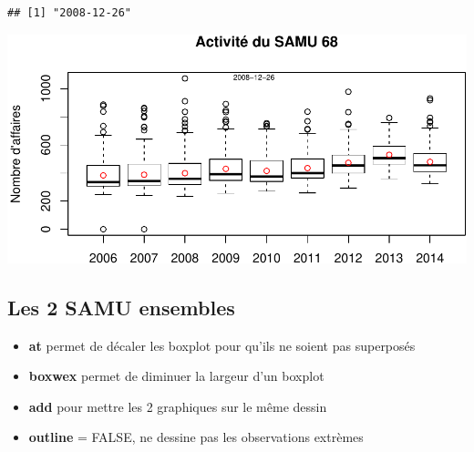 \documentclass[]{article}
\newenvironment{Shaded}{\begin{snugshade}}{\end{snugshade}}
\newcommand{\KeywordTok}[1]{\textcolor[rgb]{0.13,0.29,0.53}{\textbf{{#1}}}}
\newcommand{\DataTypeTok}[1]{\textcolor[rgb]{0.13,0.29,0.53}{{#1}}}
\newcommand{\DecValTok}[1]{\textcolor[rgb]{0.00,0.00,0.81}{{#1}}}
\newcommand{\NormalTok}[1]{{#1}}
\begin{document}
\begin{verbatim}
## [1] "2008-12-26"
\end{verbatim}

\begin{Shaded}
\end{Shaded}

\includegraphics{samu_files/figure-latex/samu68-4.pdf}

\subsection{Les 2 SAMU ensembles}\label{les-2-samu-ensembles}

\begin{itemize}
\itemsep1pt\parskip0pt
\item
  \textbf{at} permet de décaler les boxplot pour qu'ils ne soient pas
  superposés
\item
  \textbf{boxwex} permet de diminuer la largeur d'un boxplot
\item
  \textbf{add} pour mettre les 2 graphiques sur le même dessin
\item
  \textbf{outline} = FALSE, ne dessine pas les observations extrèmes
\end{itemize}
\end{document}
